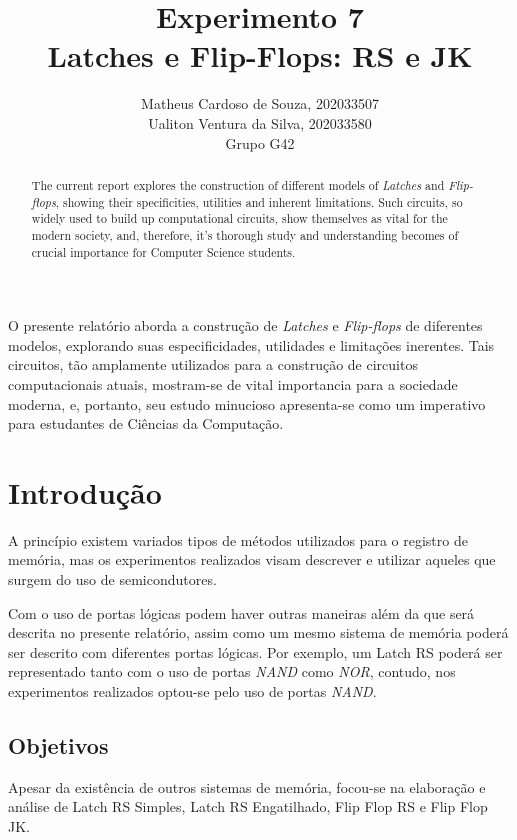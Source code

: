 \documentclass[12pt]{article}
\title{Experimento 7\\
Latches e Flip-Flops: RS e JK}
\author{Matheus Cardoso de Souza, 202033507\\
        Ualiton Ventura da Silva, 202033580\\
        Grupo G42
}
\begin{document}
\maketitle

 \begin{abstract}
   The current report explores the construction of different models of
   \emph{Latches} and \emph{Flip-flops}, showing their specificities, utilities
   and inherent limitations. Such circuits, so widely used to build up
   computational circuits, show themselves as vital for the modern society, and,
   therefore, it's thorough study and understanding becomes of crucial
   importance for Computer Science students.
 \end{abstract}

 \begin{resumo}
   O presente relatório aborda a construção de \emph{Latches} e
   \emph{Flip-flops} de diferentes modelos, explorando suas especificidades,
   utilidades e limitações inerentes. Tais circuitos, tão amplamente utilizados
   para a construção de circuitos computacionais atuais, mostram-se de vital
   importancia para a sociedade moderna, e, portanto, seu estudo minucioso
   apresenta-se como um imperativo para estudantes de Ciências da Computação.
 \end{resumo}


\section{Introdução}\label{sec:Introducao}

A princípio existem variados tipos de métodos utilizados para o registro de
memória, mas os experimentos realizados visam descrever e utilizar aqueles que
surgem do uso de semicondutores.

Com o uso de portas lógicas podem haver outras maneiras além da que será descrita
no presente relatório, assim como um mesmo sistema de memória poderá ser
descrito com diferentes portas lógicas. Por exemplo, um Latch RS poderá ser
representado tanto com o uso de portas \emph{NAND} como \emph{NOR}, contudo, nos
experimentos realizados optou-se pelo uso de portas \emph{NAND}.

\subsection{Objetivos}\label{sec:Objetivos}
Apesar da existência de outros sistemas de memória, focou-se na elaboração e
análise de Latch RS Simples, Latch RS Engatilhado, Flip Flop RS e Flip Flop JK.
\end{document}
